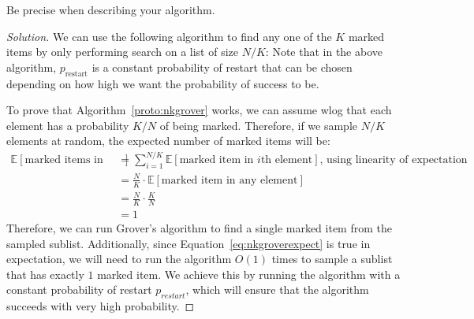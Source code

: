 \begin{solution}[label=ques:3a]
\begin{question}
Be precise when describing your algorithm.
  \end{question}
  \tcblower{}
  \begin{proof}[Solution]
    We can use the following algorithm to find any one of the $K$ marked items by only performing search on a list of size $N/K$:
    Note that in the above algorithm, $p_\text{restart}$ is a constant probability of restart that can be chosen depending on how high we want the probability of success to be.\par
    To prove that Algorithm~\ref{proto:nkgrover} works, we can assume wlog that each element has a probability $K/N$ of being marked. Therefore, if we sample $N/K$ elements at random, the expected number of marked items will be:
    \begin{equation}
      \begin{split}
        \mathbb{E}[\text{marked items in sublist}] &= \sum_{i=1}^{N/K}\mathbb{E}[\text{marked item in $i$th element}]\text{, using linearity of expectation}\\
        &= \frac{N}{K}\cdot\mathbb{E}[\text{marked item in any element}]\\
        &= \frac{N}{K}\cdot\frac{K}{N}\\
        &= 1
      \end{split}
      \label{eq:nkgroverexpect}
    \end{equation}
    Therefore, we can run Grover's algorithm to find a single marked item from the sampled sublist. Additionally, since Equation~\ref{eq:nkgroverexpect} is true in expectation, we will need to run the algorithm $O(1)$ times to sample a sublist that has exactly $1$ marked item. We achieve this by running the algorithm with a constant probability of restart $p_{restart}$, which will ensure that the algorithm succeeds with very high probability.
  \end{proof}
\end{solution}

